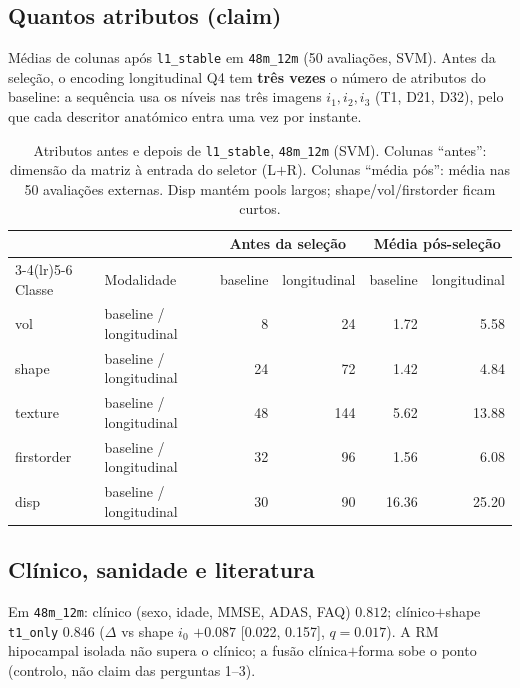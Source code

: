\documentclass[review]{elsarticle}
\newcommand{\code}[1]{\texttt{#1}}
\begin{document}
\subsection{Quantos atributos (claim)}
\label{subsec:atributos-sel}

Médias de colunas após \code{l1\_stable} em \code{48m\_12m} (50 avaliações, SVM).
Antes da seleção, o encoding longitudinal Q4 tem \textbf{três vezes} o número de atributos do baseline:
a sequência usa os níveis nas três imagens $i_1,i_2,i_3$ (T1, D21, D32),
pelo que cada descritor anatómico entra uma vez por instante.

\begin{table}[htbp]
	\centering
	\footnotesize
	\caption{Atributos antes e depois de \code{l1\_stable}, \code{48m\_12m} (SVM).
		Colunas ``antes'': dimensão da matriz à entrada do seletor (L$+$R).
		Colunas ``média pós'': média nas 50 avaliações externas.
		Disp mantém pools largos; shape/vol/firstorder ficam curtos.}
	\label{tab:nfeat}
	\begin{tabular}{ll rr rr}
		\toprule
		& & \multicolumn{2}{c}{Antes da seleção} & \multicolumn{2}{c}{Média pós-seleção} \\
		\cmidrule(lr){3-4}\cmidrule(lr){5-6}
		Classe & Modalidade & baseline & longitudinal & baseline & longitudinal \\
		\midrule
		vol & baseline / longitudinal & 8 & 24 & 1.72 & 5.58 \\
		shape & baseline / longitudinal & 24 & 72 & 1.42 & 4.84 \\
		texture & baseline / longitudinal & 48 & 144 & 5.62 & 13.88 \\
		firstorder & baseline / longitudinal & 32 & 96 & 1.56 & 6.08 \\
		disp & baseline / longitudinal & 30 & 90 & 16.36 & 25.20 \\
		\bottomrule
	\end{tabular}
\end{table}

\subsection{Clínico, sanidade e literatura}
\label{subsec:controlos}

Em \code{48m\_12m}: clínico (sexo, idade, MMSE, ADAS, FAQ) $0.812$;
clínico$+$shape \code{t1\_only} $0.846$
($\Delta$ vs shape $i_0$ $+0.087$ [0.022, 0.157], $q=0.017$).
A RM hipocampal isolada não supera o clínico; a fusão clínica$+$forma sobe o ponto
(controlo, não claim das perguntas 1--3).
\end{document}
